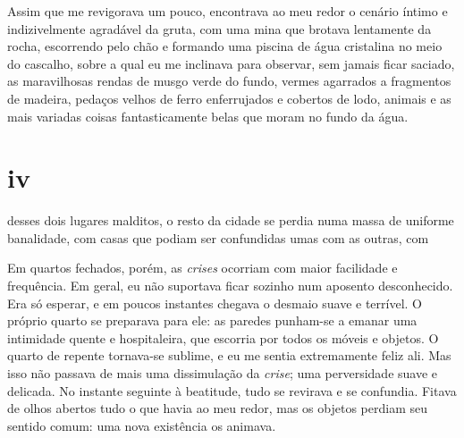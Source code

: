 

Assim que me revigorava um pouco, encontrava ao meu redor o cenário íntimo e
indizivelmente agradável da gruta, com uma mina que brotava lentamente da
rocha, escorrendo pelo chão e formando uma piscina de água cristalina no meio
do cascalho, sobre a qual eu me inclinava para observar, sem jamais ficar
saciado, as maravilhosas rendas de musgo verde do fundo, vermes agarrados a
fragmentos de madeira, pedaços velhos de ferro enferrujados e cobertos de
lodo, animais e as mais variadas coisas fantasticamente belas que moram no
fundo da água.

\section{iv} 

 desses dois lugares malditos, o resto da cidade se perdia numa
 massa de uniforme banalidade, com casas que podiam ser confundidas umas com
 as outras, com 

Em quartos fechados, porém, as \textit{crises} ocorriam com maior facilidade e
frequência. Em geral, eu não suportava ficar sozinho num aposento
desconhecido. Era só esperar, e em poucos instantes chegava o desmaio suave e
terrível. O próprio quarto se preparava para ele: as paredes punham-se a
emanar uma intimidade quente e hospitaleira, que escorria por todos os móveis
e objetos. O quarto de repente tornava-se sublime, e eu me sentia
extremamente feliz ali. Mas isso não passava de mais uma dissimulação
da \textit{crise}; uma perversidade suave e delicada. No instante seguinte à
beatitude, tudo se revirava e se confundia. Fitava de olhos abertos tudo o
que havia ao meu redor, mas os objetos perdiam seu sentido comum: uma nova
existência os animava.


